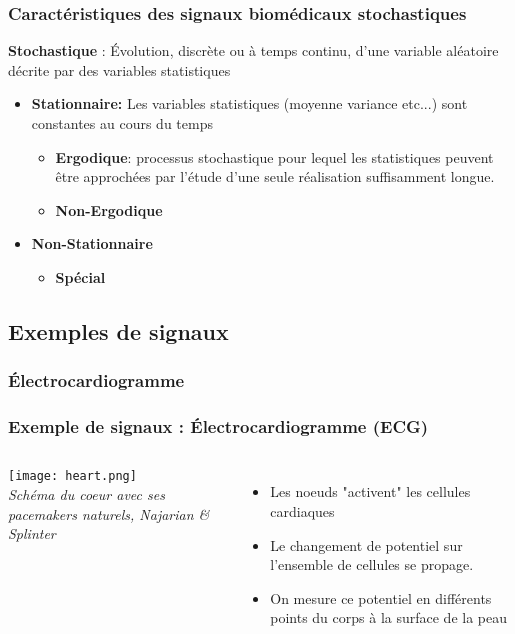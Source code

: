 \documentclass{beamer}
\begin{document}
\begin{frame}
\frametitle{Caractéristiques des signaux biomédicaux stochastiques}
\textbf{Stochastique} :  \'Evolution, discrète ou à temps continu, d'une variable aléatoire décrite par des variables statistiques
\vspace{0.2cm}
\begin{itemize}
\item \textbf{Stationnaire:} Les variables statistiques (moyenne variance etc...) sont constantes au cours du temps 
\vspace{0.1cm}
\begin{itemize}
 \item \textbf{Ergodique}:  processus stochastique pour lequel les statistiques peuvent être approchées par l'étude d'une seule réalisation suffisamment longue. 
 \vspace{0.1cm}
 \item \textbf{Non-Ergodique}
\end{itemize}
\vspace{0.2cm}
\item \textbf{Non-Stationnaire}
\vspace{0.1cm}
\begin{itemize}
 \item \textbf{Spécial}
\end{itemize}
\end{itemize}
\end{frame}

\subsection{Exemples de signaux}
\subsubsection{\'Electrocardiogramme}
\begin{frame}
\frametitle{Exemple de signaux : \'Electrocardiogramme (ECG) }
\begin{columns}
\column{60mm}
\texttt{[image: heart.png]}\\
\textit{\footnotesize Schéma du coeur avec ses pacemakers naturels, Najarian \& Splinter}
\column{60mm}
\begin{itemize}
\item Les noeuds "activent" les cellules cardiaques
\vspace{0.5cm}
\item Le changement de potentiel sur l'ensemble de cellules se propage. 
\vspace{0.3cm}
\item On mesure ce potentiel en différents points du corps à la surface de la peau 
\end{itemize}
\end{columns}
\end{frame}
\end{document}
